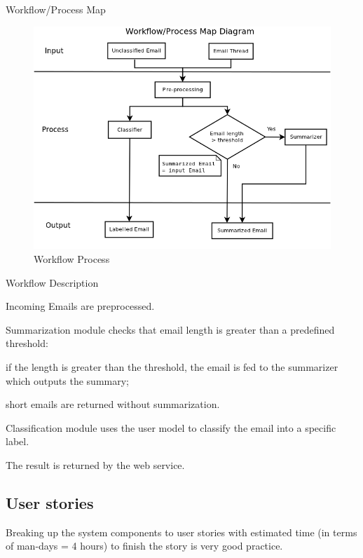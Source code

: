\newpage
\begin{my_enumerate}
  \item Workflow/Process Map 
	
\begin{figure}
  \centering
\includegraphics[width=13cm]{workflow_process_map.png}
  \caption[Workflow Process] {Workflow Process}
\end{figure}

  \item Workflow Description
  \begin{my_itemize}
    \item Incoming Emails are preprocessed.
    \item Summarization module checks that email length is greater than a predefined threshold:
    \begin{my_itemize}
      \item if the length is greater than the threshold, the email is fed to the 
	    summarizer which outputs the summary;
      \item short emails are returned without summarization.
    \end{my_itemize}
    \item Classification module uses the user model to classify the email into a specific label.
    \item The result is returned by the web service.
  \end{my_itemize}
\end{my_enumerate}

\subsection{User stories}
Breaking up the system components to user stories with estimated time (in terms
of man-days = 4 hours) to finish the story is very good practice.
\\

